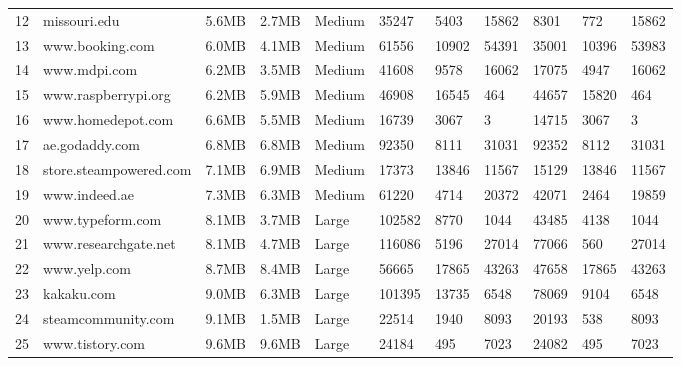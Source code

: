 \begin{table*}[t]
{\begin{tabular}{|l|ll|l|l|lll|lll|}
12 &            missouri.edu &          5.6MB &           2.7MB &   Medium &     35247 &        5403 &      15862 &      8301 &         772 &      15862 \\
13 &         www.booking.com &          6.0MB &           4.1MB &   Medium &     61556 &       10902 &      54391 &     35001 &       10396 &      53983 \\
14 &            www.mdpi.com &          6.2MB &           3.5MB &   Medium &     41608 &        9578 &      16062 &     17075 &        4947 &      16062 \\
15 &     www.raspberrypi.org &          6.2MB &           5.9MB &   Medium &     46908 &       16545 &        464 &     44657 &       15820 &        464 \\
16 &       www.homedepot.com &          6.6MB &           5.5MB &   Medium &     16739 &        3067 &          3 &     14715 &        3067 &          3 \\
17 &          ae.godaddy.com &          6.8MB &           6.8MB &   Medium &     92350 &        8111 &      31031 &     92352 &        8112 &      31031 \\
18 &  store.steampowered.com &          7.1MB &           6.9MB &   Medium &     17373 &       13846 &      11567 &     15129 &       13846 &      11567 \\
19 &           www.indeed.ae &          7.3MB &           6.3MB &   Medium &     61220 &        4714 &      20372 &     42071 &        2464 &      19859 \\\midrule
20 &        www.typeform.com &          8.1MB &           3.7MB &    Large &    102582 &        8770 &       1044 &     43485 &        4138 &       1044 \\
21 &    www.researchgate.net &          8.1MB &           4.7MB &    Large &    116086 &        5196 &      27014 &     77066 &         560 &      27014 \\
22 &            www.yelp.com &          8.7MB &           8.4MB &    Large &     56665 &       17865 &      43263 &     47658 &       17865 &      43263 \\
23 &              kakaku.com &          9.0MB &           6.3MB &    Large &    101395 &       13735 &       6548 &     78069 &        9104 &       6548 \\
24 &      steamcommunity.com &          9.1MB &           1.5MB &    Large &     22514 &        1940 &       8093 &     20193 &         538 &       8093 \\
25 &         www.tistory.com &          9.6MB &           9.6MB &    Large &     24184 &         495 &       7023 &     24082 &         495 &       7023 \\

\end{tabular}}
\end{table*}
